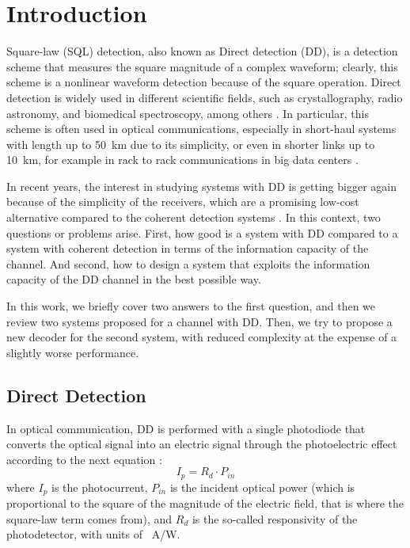 \chapter{Introduction}
\label{ch:introduction}
\newcommand{\IntroImage}[1]{images/intro/#1}


	

Square-law (SQL) detection, also known as Direct detection (DD), is a detection scheme that measures the square magnitude of a complex waveform; clearly, this scheme is a nonlinear waveform detection because of the square operation. Direct detection is widely used in different scientific fields, such as crystallography, radio astronomy, and biomedical spectroscopy, among others \cite{Tasbihi_Tukey}. In particular, this scheme is often used in optical communications, especially in short-haul systems with length up to \SI{50}{\km} \cite{Agrawal_ch1} due to its simplicity, or even in shorter links up to \SI{10}{\km}, for example in rack to rack communications in big data centers \cite{Tasbihi_Tukey}.
%
%

In recent years, the interest in studying systems with DD is getting bigger again because of the simplicity of the receivers, which are a promising low-cost alternative compared to the coherent detection systems \cite{Mecozzi_2018}. In this context, two questions or problems arise. First, how good is a system with DD compared to a system with coherent detection in terms of the information capacity of the channel. And second, how to design a system that exploits the information capacity of the DD channel in the best possible way.

In this work, we briefly cover two answers to the first question, and then we review two systems proposed for a channel with DD. Then, we try to propose a new decoder for the second system, with reduced complexity at the expense of a slightly worse performance.


\section{Direct Detection}
\label{sec:Direct_Detection}

In optical communication, DD is performed with a single photodiode that converts the optical signal into an electric signal through the photoelectric effect according to the next equation \cite{Agrawal_ch4}:
\begin{equation}
I_p = R_d\cdot P_{in}
\label{eq:photocurrent}
\end{equation}
where $I_p$ is the photocurrent, $P_{in}$ is the incident optical power (which is proportional to the square of the magnitude of the electric field, that is where the square-law term comes from), and $R_d$ is the so-called responsivity of the photodetector, with units of \SI{}{\A/\W}.

